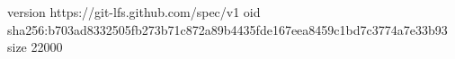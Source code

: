 version https://git-lfs.github.com/spec/v1
oid sha256:b703ad8332505fb273b71c872a89b4435fde167eea8459c1bd7c3774a7e33b93
size 22000
